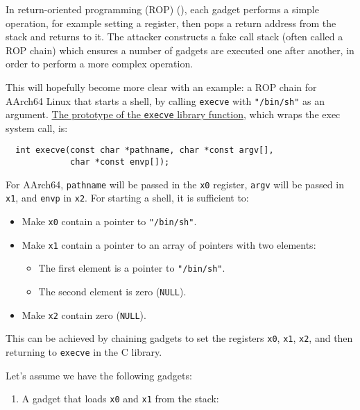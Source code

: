 \documentclass[
  a4paper,
]{report}
\providecommand{\tightlist}{%
  \setlength{\itemsep}{0pt}\setlength{\parskip}{0pt}}
\begin{document}
In return-oriented programming
(ROP)
(), each gadget performs a
simple operation, for example setting a register, then pops a return
address from the stack and returns to it. The attacker constructs a fake
call stack (often called a ROP chain) which ensures a number of gadgets are executed one after
another, in order to perform a more complex operation.

This will hopefully become more clear with an example: a ROP chain for
AArch64 Linux that starts a shell, by calling \texttt{execve} with
\texttt{"/bin/sh"} as an argument.
\href{https://man7.org/linux/man-pages/man2/execve.2.html}{The prototype
of the \texttt{execve} library function}, which wraps the exec system
call, is:

\begin{verbatim}
  int execve(const char *pathname, char *const argv[],
             char *const envp[]);
\end{verbatim}

For AArch64, \texttt{pathname} will be passed in the \texttt{x0}
register, \texttt{argv} will be passed in \texttt{x1}, and \texttt{envp}
in \texttt{x2}. For starting a shell, it is sufficient to:

\begin{itemize}
\tightlist
\item
  Make \texttt{x0} contain a pointer to \texttt{"/bin/sh"}.
\item
  Make \texttt{x1} contain a pointer to an array of pointers with two
  elements:

  \begin{itemize}
  \tightlist
  \item
    The first element is a pointer to \texttt{"/bin/sh"}.
  \item
    The second element is zero (\texttt{NULL}).
  \end{itemize}
\item
  Make \texttt{x2} contain zero (\texttt{NULL}).
\end{itemize}

This can be achieved by chaining gadgets to set the registers
\texttt{x0}, \texttt{x1}, \texttt{x2}, and then returning to
\texttt{execve} in the C library.

Let's assume we have the following gadgets:

\begin{enumerate}
\def\labelenumi{\arabic{enumi}.}
\tightlist
\item
  A gadget that loads \texttt{x0} and \texttt{x1} from the stack:
\end{enumerate}
\end{document}

